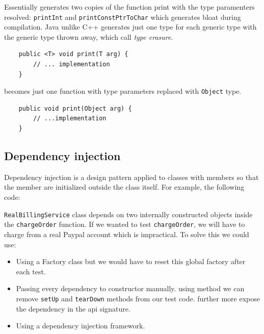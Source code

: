 \documentclass[a4paper]{article}
\begin{document}
Essentially generates two copies of the function print with the type paramenters resolved: \lstinline{printInt} and
\lstinline{printConstPtrToChar} which generates bloat during compilation. Java unlike C++ generates just one type for each
generic type with the generic type thrown away, which call \emph{type erasure}.

\lstset{style=custom-java}
\begin{lstlisting}
    public <T> void print(T arg) {
        // ... implementation
    }
\end{lstlisting}

\begin{flushleft}
    becomes just one function with type parameters replaced with \lstinline{Object} type.    
\end{flushleft}

\begin{lstlisting}
    public void print(Object arg) {
        // ...implementation
    }
\end{lstlisting}

\subsection*{Dependency injection}

Dependency injection is a design pattern applied to classes with members so that the member are initialized outside the class
itself. For example, the following code:



\lstinline{RealBillingService} class depends on two internally constructed objects inside the \lstinline{chargeOrder}
function. If we wanted to test \lstinline{chargeOrder}, we will have to charge from a real Paypal account which is
impractical. To solve this we could use:

\begin{itemize}
    \item Using a Factory class but we would have to reset this global factory after each test.
    \item Passing every dependency to constructor manually. using method we can remove \lstinline{setUp} and \lstinline{tearDown}
          methods from our test code. further more expose the dependency in the api signature.
    \item Using a dependency injection framework.
\end{itemize}
\end{document}
